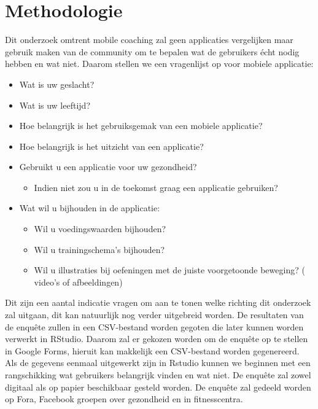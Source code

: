 


\section{Methodologie}
\label{sec:methodologie}
Dit onderzoek omtrent mobile coaching zal geen applicaties vergelijken maar gebruik maken van de community om te bepalen wat de gebruikers écht nodig hebben en wat niet. Daarom stellen we een vragenlijst op voor mobiele applicatie: 
\begin{itemize}
\item Wat is uw geslacht?
\item Wat is uw leeftijd?
\item Hoe belangrijk is het gebruiksgemak van een mobiele applicatie?
\item Hoe belangrijk is het uitzicht van een applicatie?
\item Gebruikt u een applicatie voor uw gezondheid?
\begin{itemize}
\item Indien niet zou u in de toekomst graag een applicatie gebruiken?
\end{itemize}
\item Wat wil u bijhouden in de applicatie:
\begin{itemize}
\item Wil u voedingswaarden bijhouden?
\item Wil u trainingschema's bijhouden?
\item Wil u illustraties bij oefeningen met de juiste voorgetoonde beweging? ( video's of afbeeldingen) 
\end{itemize}
\end{itemize}
Dit zijn een aantal indicatie vragen om aan te tonen welke richting dit onderzoek zal uitgaan, dit kan natuurlijk nog verder uitgebreid worden. De resultaten van de enquête zullen in een CSV-bestand worden gegoten die later kunnen worden verwerkt in RStudio. Daarom zal er gekozen worden om de enquête op te stellen in Google Forms, hieruit kan makkelijk een CSV-bestand worden gegenereerd.
 Als de gegevens eenmaal uitgewerkt zijn in Rstudio kunnen we beginnen met een rangschikking wat gebruikers belangrijk vinden en wat niet. \hfill \break \break
 De enquête zal zowel digitaal als op papier beschikbaar gesteld worden. De enquête zal gedeeld worden op Fora, Facebook groepen over gezondheid en in fitnesscentra.

